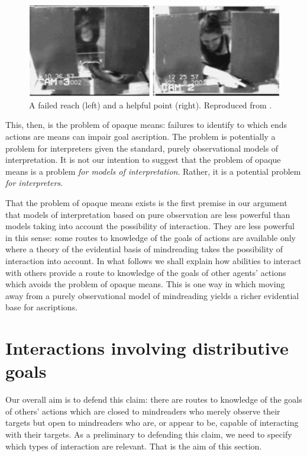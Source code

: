 \documentclass[14pt,a4paper]{extarticle}
\begin{document}
\begin{figure}
\begin{center}
\includegraphics[width=12cm]{figure_hare_toma_2004_e3.png}
\caption{
\label{fig:reach_point}
	A failed reach (left) and a helpful point (right).
	Reproduced from \citet[p.\ 557, figure 4]{hare_chimpanzees_2004}.
}
\end{center}
\end{figure}

This, then, is the problem of opaque means:
failures to identify to which ends actions are means can impair goal ascription.
The problem is potentially a problem for interpreters given the standard, purely observational models of interpretation.
It is not our intention to suggest that the problem of opaque means is a problem \emph{for models of interpretation}.
Rather, it is a potential problem \emph{for interpreters}.

That the problem of opaque means exists
is the first premise in our argument
that models of interpretation based on pure observation are less powerful than models taking into account the possibility of interaction.
They are less powerful in this sense: 
some routes to knowledge of the goals of actions are available only where a theory of the evidential basis of mindreading 
 takes the possibility of interaction into account.
In what follows we shall explain how abilities to interact with others provide a route to knowledge of the goals of other agents' actions  which avoids the problem of opaque means.
This is one way in which moving away from a purely observational model of mindreading yields a richer evidential base for ascriptions.


\section{Interactions involving distributive goals}
\label{sec:joint_action}
Our overall aim is to defend this claim:
there are routes to knowledge of the goals of others' actions
which are closed to
mindreaders who merely observe their targets
but open to 
mindreaders who are, or appear to be, capable of interacting with their targets.
As a preliminary to defending this claim,
we need to specify which types of interaction are relevant.
That is the aim of this section.
\end{document}
